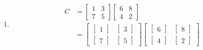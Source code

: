 \documentclass[12pt,letterpaper]{article}
\begin{document}
\begin{enumerate}
    \item
      \begin{align*}
        C &=
        \begin{bmatrix}
          1 & 3 \\
          7 & 5
        \end{bmatrix}
        \begin{bmatrix}
          6 & 8 \\
          4 & 2
        \end{bmatrix} \\
        &=
        \begin{bmatrix}
          \begin{bmatrix}
            1
          \end{bmatrix}
          &
          \begin{bmatrix}
            3
          \end{bmatrix}
          \\
          \begin{bmatrix}
            7
          \end{bmatrix}
          &
          \begin{bmatrix}
            5
          \end{bmatrix}
        \end{bmatrix}
        \begin{bmatrix}
          \begin{bmatrix}
            6
          \end{bmatrix}
          &
          \begin{bmatrix}
            8
          \end{bmatrix}
          \\
          \begin{bmatrix}
            4
          \end{bmatrix}
          &
          \begin{bmatrix}
            2
          \end{bmatrix}
        \end{bmatrix}
      \end{align*}
  \end{enumerate}
\end{document}
